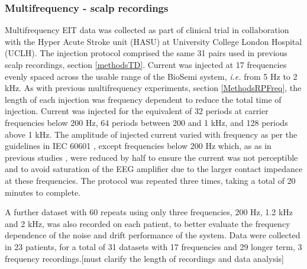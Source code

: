 \subsubsection{Multifrequency - scalp recordings}

Multifrequency EIT data was collected as part of clinical trial in collaboration with the Hyper Acute Stroke unit (HASU) at University College London Hospital (UCLH). The injection protocol comprised the same 31 pairs used in previous scalp recordings, section \ref{methodsTD}.  Current was injected at 17 frequencies evenly spaced across the usable range of the BioSemi system, \emph{i.e.} from 5 Hz to 2 kHz. As with previous multifrequency experiments, section \ref{MethodsRPFreq}, the length of each injection was frequency dependent to reduce the total time of injection. Current was injected for the equivalent of 32 periods at carrier frequencies below 200 Hz, 64 periods between 200 and 1 kHz, and 128 periods above 1 kHz. The amplitude of injected current varied with frequency as per the guidelines in IEC 60601 \cite{IEC}, except frequencies below 200 Hz which, as as in previous studies \cite{McEwan_2006}, were reduced by half to ensure the current was not perceptible and to avoid saturation of the EEG amplifier due to the larger contact impedance at these frequencies. The protocol was repeated three times, taking a total of 20 minutes to complete. 

A further dataset with 60 repeats using only three frequencies, 200 Hz, 1.2 kHz and 2 kHz, was also recorded on each patient, to better evaluate the frequency dependence of the noise and drift performance of the system. Data were collected in 23 patients, for a total of 31 datasets with 17 frequencies and 29 longer term, 3 frequency recordings.[must clarify the length of recordings and data analysis] 